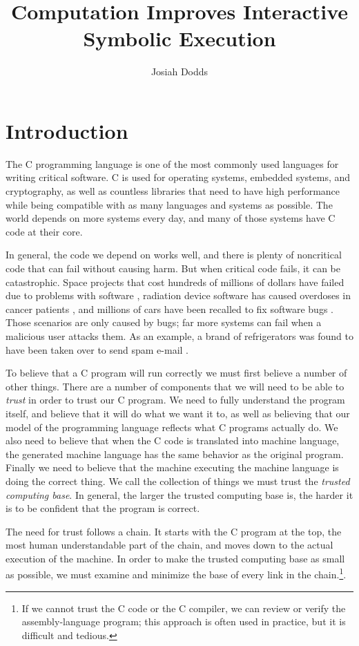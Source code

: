\documentclass{puthesis}
\author{Josiah Dodds}
\title{Computation Improves Interactive Symbolic Execution}
\begin{document}
\chapter{Introduction}

The C programming language is one of the most commonly used languages
for writing critical software. C is used for operating systems,
embedded systems, and cryptography, as well as countless libraries
that need to have high performance while being compatible with as many
languages and systems as possible. The world depends on more systems
every day, and many of those systems have C code at their core.

In general, the code we depend on works well, and there is plenty of
noncritical code that can fail without causing harm.  But when critical
code fails, it can be catastrophic. Space projects that cost hundreds
of millions of dollars have failed due to problems with software
\cite{polarlander, marsorbit}, radiation device software has caused
overdoses in cancer patients \cite{therac}, and millions of cars have
been recalled to fix software bugs \cite{toyotarecall}. Those scenarios
are only caused by bugs; far more systems can fail when a malicious
user attacks them. As an example, a brand of refrigerators was found
to have been taken over to send spam e-mail \cite{fridgenet}.

To believe that a C program will run correctly we must first believe a
number of other things. There are a number of components that we will
need to be able to \emph{trust} in order to trust our C program. We
need to fully understand the program itself, and believe that it will
do what we want it to, as well as believing that our model of the
programming language reflects what C programs actually do. We also
need to believe that when the C code is translated into machine
language, the generated machine language has the same behavior as the
original program. Finally we need to believe that the machine
executing the machine language is doing the correct thing. We call the
collection of things we must trust the \emph{trusted computing
  base}. In general, the larger the trusted computing base is, the
harder it is to be confident that the program is correct.

The need for trust follows a chain. It starts with the C program at
the top, the most human understandable part of the chain, and moves
down to the actual execution of the machine. In order to make the
trusted computing base as small as possible, we must examine and
minimize the base of every link in the chain.\footnote{If we cannot
  trust the C code or the C compiler, we can review or verify the
  assembly-language program; this approach is often used in practice,
  but it is difficult and tedious.}.
\end{document}

